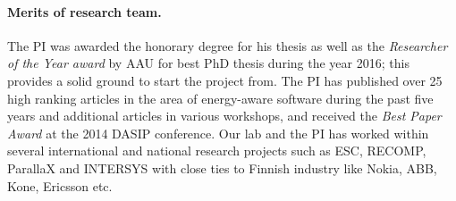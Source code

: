 \documentclass{article}
\begin{document}
\paragraph{Merits of research team.}
The PI was awarded the honorary degree for his thesis as well as the \textit{Researcher of the Year award} by AAU for best PhD thesis during the year 2016; this provides a solid ground to start the project from.
The PI has published over 25 high ranking articles in the area of energy-aware software during the past five years and additional articles in various workshops, 
and received the \textit{Best Paper Award} at the 2014 DASIP conference.
Our lab and the PI has worked within several international and national research projects such as ESC, RECOMP, ParallaX and INTERSYS with close ties to Finnish industry like Nokia, ABB, Kone, Ericsson etc.
\end{document}
